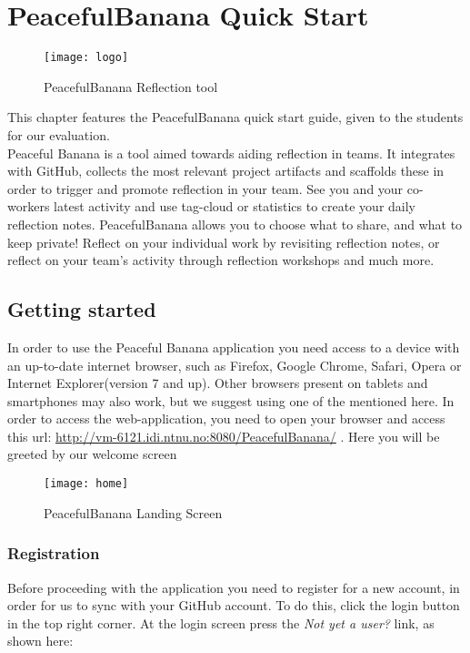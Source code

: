 \chapter{PeacefulBanana Quick Start}

\begin{figure}[h!]
\label{logo}
\centering
	\texttt{[image: logo]}
\caption{PeacefulBanana Reflection tool}
\end{figure}

This chapter features the PeacefulBanana quick start guide, given to the students for our evaluation. \\
Peaceful Banana is a tool aimed towards aiding reflection in teams. It integrates with GitHub, collects the most relevant project artifacts and scaffolds these in order to trigger and promote reflection in your team.
See you and your co-workers latest activity and use tag-cloud or statistics to create your daily reflection notes. PeacefulBanana allows you to choose what to share, and what to keep private! Reflect on your individual work by revisiting reflection notes, or reflect on your team's activity through reflection workshops and much more. 
\pagebreak


\section{Getting started}
In order to use the Peaceful Banana application you need access to a device with an up-to-date internet browser, such as Firefox, Google Chrome, Safari, Opera or Internet Explorer(version 7 and up). Other browsers present on tablets and smartphones may also work, but we suggest using one of the mentioned here. 
In order to access the web-application, you need to open your browser and access this url: \url{http://vm-6121.idi.ntnu.no:8080/PeacefulBanana/} . Here you will be greeted by our welcome screen\\

\begin{figure}[h!]
\label{homescreen}
\centering
	\texttt{[image: home]}
\caption{PeacefulBanana Landing Screen}
\end{figure}

\subsection{Registration}
Before proceeding with the application you need to register for a new account, in order for us to sync with your GitHub account. To do this, click the login button in the top right corner. At the login screen press the 
\textit{Not yet a user?} link, as shown here:

